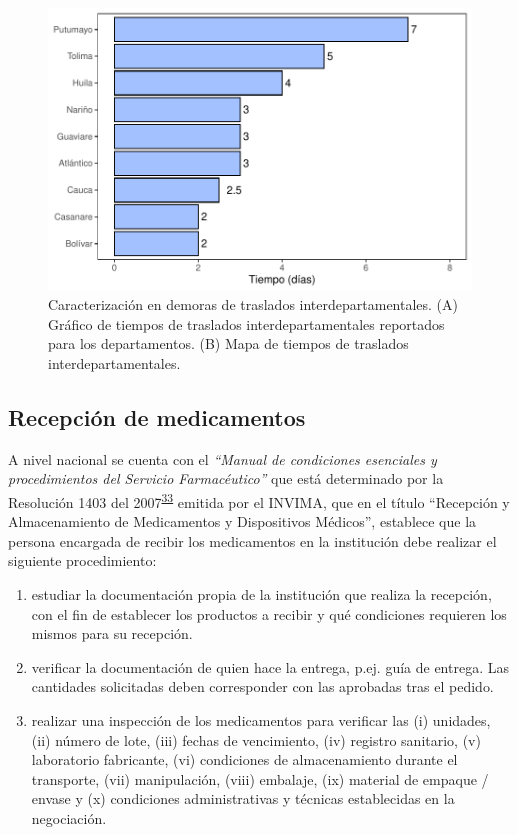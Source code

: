\documentclass[
]{book}
\begin{document}
\begin{figure}[t]

{\centering \includegraphics[width=1\linewidth]{InformeFinal_files/figure-latex/TiemposTranslados-1} 

}

\caption{Caracterización en demoras de traslados interdepartamentales. (A) Gráfico de tiempos de traslados interdepartamentales reportados para los departamentos. (B) Mapa de tiempos de traslados interdepartamentales.}\label{fig:TiemposTranslados}
\end{figure}

\hypertarget{recepciuxf3n-de-medicamentos}{%
\subsection{Recepción de medicamentos}\label{recepciuxf3n-de-medicamentos}}

A nivel nacional se cuenta con el \emph{``Manual de condiciones esenciales y procedimientos del Servicio Farmacéutico''} que está determinado por la Resolución 1403 del 2007\textsuperscript{\protect\hyperlink{ref-MinisteriodeSaludyProteccionSocial2007}{33}} emitida por el INVIMA, que en el título ``Recepción y Almacenamiento de Medicamentos y Dispositivos Médicos'', establece que la persona encargada de recibir los medicamentos en la institución debe realizar el siguiente procedimiento:

\begin{enumerate}
\def\labelenumi{\arabic{enumi}.}
\item
  estudiar la documentación propia de la institución que realiza la recepción, con el fin de establecer los productos a recibir y qué condiciones requieren los mismos para su recepción.
\item
  verificar la documentación de quien hace la entrega, p.ej. guía de entrega. Las cantidades solicitadas deben corresponder con las aprobadas tras el pedido.
\item
  realizar una inspección de los medicamentos para verificar las (i) unidades, (ii) número de lote, (iii) fechas de vencimiento, (iv) registro sanitario, (v) laboratorio fabricante, (vi) condiciones de almacenamiento durante el transporte, (vii) manipulación, (viii) embalaje, (ix) material de empaque / envase y (x) condiciones administrativas y técnicas establecidas en la negociación.
\end{enumerate}
\end{document}
